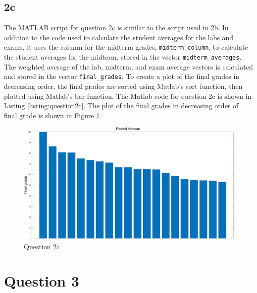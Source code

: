 \documentclass[12pt]{article}
\begin{document}
\subsection*{2c}
The MATLAB script for question 2c is similar to the script used in 2b. In addition to the code used to calculate the student averages for the labs and exams, it uses the column for the midterm grades, \verb|midterm_column|, to calculate the student averages for the midterm, stored in the vector \verb|midterm_averages|. The weighted average of the lab, midterm, and exam average vectors is calculated and stored in the vector \verb|final_grades|. To create a plot of the final grades in decreasing order, the final grades are sorted using Matlab's sort function, then plotted using Matlab's bar function. The Matlab code for question 2c is shown in Listing \ref{listing:question2c}. The plot of the final grades in decreasing order of final grade is shown in Figure \ref{fig:question2c}. 

\begin{figure}[!ht]
    \centering
    \includegraphics[width=\textwidth]{question2c.png}
    \caption{Question 2c}
    \label{fig:question2c}
\end{figure}
\pagebreak
\section*{Question 3}
\end{document}
